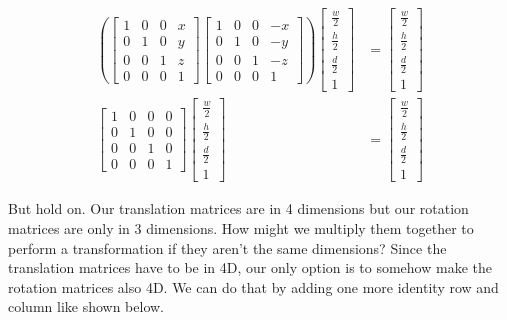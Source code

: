 \documentclass[14pt]{article}
\begin{document}
\begin{equation}
\begin{aligned}
	\left( \begin{bmatrix}
			1 & 0 & 0 & x \\
			0 & 1 & 0 & y \\ 
			0 & 0 & 1 & z \\
			0 & 0 & 0 & 1
	\end{bmatrix}
	\begin{bmatrix}
			1 & 0 & 0 & -x \\
			0 & 1 & 0 & -y \\ 
			0 & 0 & 1 & -z \\
			0 & 0 & 0 & 1
	\end{bmatrix} \right)
	\begin{bmatrix}
			\frac{w}{2} \\[5pt]
			\frac{h}{2} \\[5pt]
			\frac{d}{2} \\[5pt]
			1
	\end{bmatrix}
	&=
	\begin{bmatrix}
			\frac{w}{2} \\[5pt]
			\frac{h}{2} \\[5pt] 
			\frac{d}{2} \\[5pt]
			1
	\end{bmatrix} \\[6pt]
	\begin{bmatrix}
			1 & 0 & 0 & 0 \\
			0 & 1 & 0 & 0 \\ 
			0 & 0 & 1 & 0 \\
			0 & 0 & 0 & 1
	\end{bmatrix}
	\begin{bmatrix}
			\frac{w}{2} \\[5pt]
			\frac{h}{2} \\[5pt]
			\frac{d}{2} \\[5pt]
			1
	\end{bmatrix}
	&=
	\begin{bmatrix}
			\frac{w}{2} \\[5pt]
			\frac{h}{2} \\[5pt]
			\frac{d}{2} \\[5pt]
			1
	\end{bmatrix}
\end{aligned}
\end{equation}

\vspace*{1em}

But hold on. Our translation matrices are in 4 dimensions but our rotation matrices are only in 3 dimensions. How might we multiply them together to perform a transformation if they aren't the same dimensions? Since the translation matrices have to be in 4D, our only option is to somehow make the rotation matrices also 4D. We can do that by adding one more identity row and column like shown below.
\end{document}
